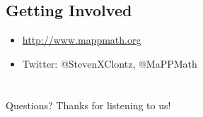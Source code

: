 \documentclass{beamer}
\theoremstyle{theorem}
\theoremstyle{definition}
\newcommand{\<}{\langle}
\renewcommand{\>}{\rangle}
\begin{document}
\subsection{Getting Involved}
\begin{frame}
  \begin{itemize}
    \item \url{http://www.mappmath.org}
    \item Twitter: @StevenXClontz, @MaPPMath
  \end{itemize}
\end{frame}

\section*{}

\begin{frame}
Questions? Thanks for listening to us!
\end{frame}
\end{document}
